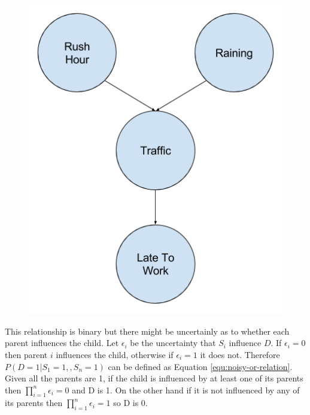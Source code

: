 \begin{minipage}[t]{0.35\textwidth}
\vspace{0px}
\begin{figure}[H]
	\centering
	\begin{minipage}[b]{1.0\textwidth}
		\includegraphics[width=\textwidth]{bayesian-network-example.png}
		\caption{}
		\label{fig:bayesian-network-example}
	\end{minipage}
	\hfill
\end{figure}
\end{minipage}

This relationship is binary but there might be uncertainly as to whether each parent influences the child. Let $\epsilon_i$ be the uncertainty that $S_i$ influence $D$. If $\epsilon_i = 0$ then parent $i$ influences the child, otherwise if $\epsilon_i = 1$ it does not. Therefore $P(D = 1| S_1 = 1, , S_n = 1)$ can be defined as Equation \ref{equ:noisy-or-relation}. Given all the parents are 1, if the child is influenced by at least one of its parents then $\prod^n_{i=1} \epsilon_i = 0$ and D is 1. On the other hand if it is not influenced by any of its parents then $\prod^n_{i=1} \epsilon_i = 1$ so D is 0.

